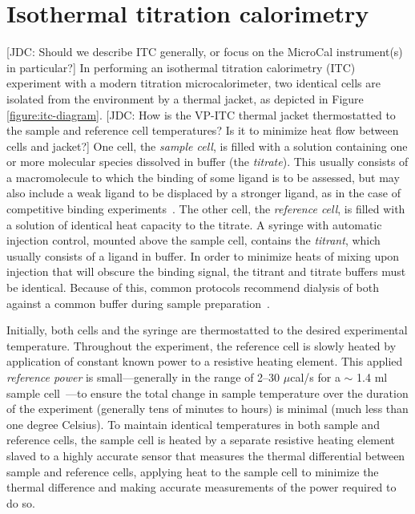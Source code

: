 \documentclass[aps,pre,twocolumn,nofootinbib,superscriptaddress,linenumbers]{revtex4-1}
\begin{document}
\section{Isothermal titration calorimetry}
\label{section:isothermal-titration-calorimetry}

{\color{red}[JDC: Should we describe ITC generally, or focus on the MicroCal instrument(s) in particular?]}
In performing an isothermal titration calorimetry (ITC) experiment with a modern titration microcalorimeter, two identical cells are isolated from the environment by a thermal jacket, as depicted in Figure \ref{figure:itc-diagram}.
{\color{red} [JDC: How is the VP-ITC thermal jacket thermostatted to the sample and reference cell temperatures?  Is it to minimize heat flow between cells and jacket?]}
One cell, the \emph{sample cell}, is filled with a solution containing one or more molecular species dissolved in buffer (the \emph{titrate}).
This usually consists of a macromolecule to which the binding of some ligand is to be assessed, but may also include a weak ligand to be displaced by a stronger ligand, as in the case of competitive binding experiments~\cite{freire:nature-protocols:2006:itc-competitive}.
The other cell, the \emph{reference cell}, is filled with a solution of identical heat capacity to the titrate.
A syringe with automatic injection control, mounted above the sample cell, contains the \emph{titrant}, which usually consists of a ligand in buffer.
In order to minimize heats of mixing upon injection that will obscure the binding signal, the titrant and titrate buffers must be identical.
Because of this, common protocols recommend dialysis of both against a common buffer during sample preparation~\cite{dialysis-against-common-buffer}.

Initially, both cells and the syringe are thermostatted to the desired experimental temperature.
Throughout the experiment, the reference cell is slowly heated by application of constant known power to a resistive heating element.
This applied \emph{reference power} is small---generally in the range of 2--30 $\mu$cal/s for a $\sim$ 1.4 ml sample cell~\cite{vp-itc-manual}---to ensure the total change in sample temperature over the duration of the experiment (generally tens of minutes to hours) is minimal (much less than one degree Celsius).
To maintain identical temperatures in both sample and reference cells, the sample cell is heated by a separate resistive heating element slaved to a highly accurate sensor that measures the thermal differential between sample and reference cells, applying heat to the sample cell to minimize the thermal difference and making accurate measurements of the power required to do so. 
\end{document}
